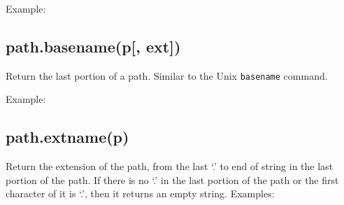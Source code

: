 Example:

\begin{Shaded}
\begin{Highlighting}[]
\NormalTok{(}\NormalTok{)}
\end{Highlighting}
\end{Shaded}

\subsection{path.basename(p{[}, ext{]})}\label{path.basenamep-ext}

Return the last portion of a path. Similar to the Unix \texttt{basename}
command.

Example:

\begin{Shaded}
\begin{Highlighting}[]
\NormalTok{(}\NormalTok{)}

\NormalTok{(}\NormalTok{, }\NormalTok{)}
\end{Highlighting}
\end{Shaded}

\subsection{path.extname(p)}\label{path.extnamep}

Return the extension of the path, from the last `.' to end of string in
the last portion of the path. If there is no `.' in the last portion of
the path or the first character of it is `.', then it returns an empty
string. Examples:

\begin{Shaded}
\begin{Highlighting}[]
\NormalTok{(}\NormalTok{)}

\NormalTok{(}\NormalTok{)}

\NormalTok{(}\NormalTok{)}

\NormalTok{(}\NormalTok{)}
\end{Highlighting}
\end{Shaded}

